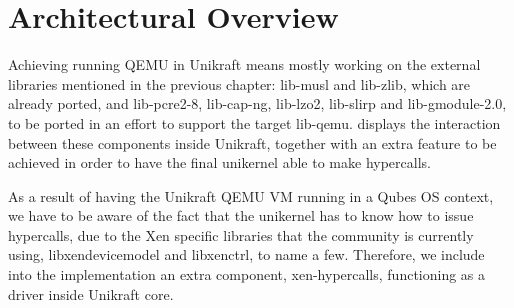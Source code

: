 \chapter{Architectural Overview}
\label{chapter:architecture}

Achieving running QEMU in Unikraft means mostly working on the external libraries mentioned in the previous chapter: lib-musl and lib-zlib, which are already ported, and lib-pcre2-8, lib-cap-ng, lib-lzo2, lib-slirp and lib-gmodule-2.0, to be ported in an effort to support the target lib-qemu.
 displays the interaction between these components inside Unikraft, together with an extra feature to be achieved in order to have the final unikernel able to make hypercalls.


As a result of having the Unikraft QEMU VM running in a Qubes OS context, we have to be aware of the fact that the unikernel has to know how to issue hypercalls, due to the Xen specific libraries that the community is currently using, libxendevicemodel and libxenctrl, to name a few.
Therefore, we include into the implementation an extra component, xen-hypercalls, functioning as a driver inside Unikraft core.
